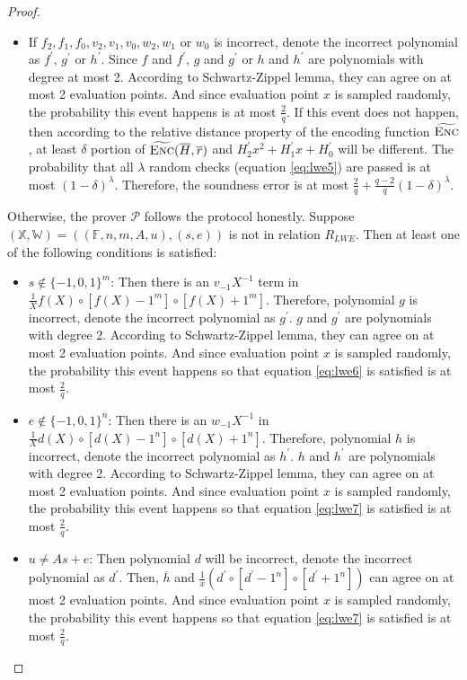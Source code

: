 \begin{proof}
\begin{itemize}
    \item If $f_2, f_1, f_0, v_2, v_1, v_0, w_2, w_1$ or $w_0$ is incorrect, denote the incorrect polynomial as $f^\prime$, $g^\prime$ or $h^\prime$. Since $f$ and $f^\prime$, $g$ and $g^\prime$ or $h$ and $h^\prime$ are polynomials with degree at most 2. According to Schwartz-Zippel lemma, they can agree on at most 2 evaluation points. And since evaluation point $x$ is sampled randomly, the probability this event happens is at most $\frac{2}{q}$. If this event does not happen, then according to the relative distance property of the encoding function $\widetilde{\textsc{Enc}}$, at least $\delta$ portion of $\widetilde{\textsc{Enc}}(\overline{H}, \overline{r})$ and $H_2^\prime x^2 + H_1^\prime x + H_0^\prime$ will be different. The probability that all $\lambda$ random checks (equation \ref{eq:lwe5}) are passed is at most $(1 - \delta)^\lambda$. Therefore, the soundness error is at most $\frac{2}{q} + \frac{q-2}{q}(1 - \delta)^\lambda$.


\end{itemize}

Otherwise, the prover $\mathcal{P}$ follows the protocol honestly. Suppose $(\mathbb{X}, \mathbb{W}) = ((\mathbb{F}, n, m, A, u), (s, e))$ is not in relation $R_{LWE}$. Then at least one of the following conditions is satisfied:
\begin{itemize}
    \item $s \notin \{-1, 0, 1\}^{m}$: Then there is an $v_{-1} X^{-1}$ term in $\frac{1}{X} f(X) \circ [f(X) - 1^m] \circ [f(X) + 1^m]$. Therefore, polynomial $g$ is incorrect, denote the incorrect polynomial as $g^\prime$. $g$ and $g^\prime$ are polynomials with degree 2. According to Schwartz-Zippel lemma, they can agree on at most 2 evaluation points. And since evaluation point $x$ is sampled randomly, the probability this event happens so that equation \ref{eq:lwe6} is satisfied is at most $\frac{2}{q}$. 
    
    \item $e \notin \{-1, 0, 1\}^{n}$: Then there is an $w_{-1} X^{-1}$ in $\frac{1}{X} d(X) \circ [d(X) - 1^n] \circ [d(X) + 1^n]$. Therefore, polynomial $h$ is incorrect, denote the incorrect polynomial as $h^\prime$. $h$ and $h^\prime$ are polynomials with degree 2. According to Schwartz-Zippel lemma, they can agree on at most 2 evaluation points. And since evaluation point $x$ is sampled randomly, the probability this event happens so that equation \ref{eq:lwe7} is satisfied is at most $\frac{2}{q}$. 
    
    \item $u \neq As + e$: Then polynomial $d$ will be incorrect, denote the incorrect polynomial as $d^\prime$. Then, $\overline{h}$ and $\frac{1}{x} (d^\prime \circ [d^\prime - 1^n] \circ [d^\prime + 1^n])$ can agree on at most 2 evaluation points. And since evaluation point $x$ is sampled randomly, the probability this event happens so that equation \ref{eq:lwe7} is satisfied is at most $\frac{2}{q}$. 
    
\end{itemize}


\end{proof}

